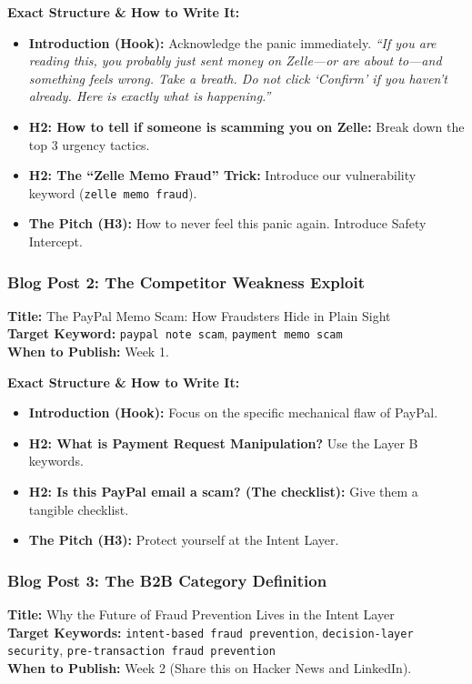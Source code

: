 \documentclass[11pt, letterpaper]{article}
\begin{document}
\textbf{Exact Structure \& How to Write It:}
\begin{itemize}
    \item \textbf{Introduction (Hook):} Acknowledge the panic immediately. \textit{``If you are reading this, you probably just sent money on Zelle---or are about to---and something feels wrong. Take a breath. Do not click `Confirm' if you haven't already. Here is exactly what is happening.''}
    \item \textbf{H2: How to tell if someone is scamming you on Zelle:} Break down the top 3 urgency tactics.
    \item \textbf{H2: The ``Zelle Memo Fraud'' Trick:} Introduce our vulnerability keyword (\texttt{zelle memo fraud}).
    \item \textbf{The Pitch (H3):} How to never feel this panic again. Introduce Safety Intercept.
\end{itemize}

\subsubsection*{Blog Post 2: The Competitor Weakness Exploit}
\textbf{Title:} The PayPal Memo Scam: How Fraudsters Hide in Plain Sight\\
\textbf{Target Keyword:} \texttt{paypal note scam}, \texttt{payment memo scam}\\
\textbf{When to Publish:} Week 1.

\textbf{Exact Structure \& How to Write It:}
\begin{itemize}
    \item \textbf{Introduction (Hook):} Focus on the specific mechanical flaw of PayPal.
    \item \textbf{H2: What is Payment Request Manipulation?} Use the Layer B keywords.
    \item \textbf{H2: Is this PayPal email a scam? (The checklist):} Give them a tangible checklist.
    \item \textbf{The Pitch (H3):} Protect yourself at the Intent Layer.
\end{itemize}

\subsubsection*{Blog Post 3: The B2B Category Definition}
\textbf{Title:} Why the Future of Fraud Prevention Lives in the Intent Layer\\
\textbf{Target Keywords:} \texttt{intent-based fraud prevention}, \texttt{decision-layer security}, \texttt{pre-transaction fraud prevention}\\
\textbf{When to Publish:} Week 2 (Share this on Hacker News and LinkedIn).
\end{document}
